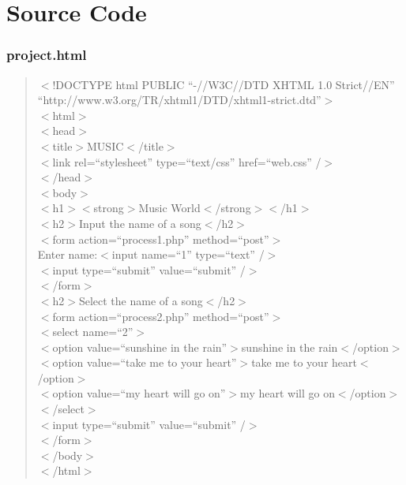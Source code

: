 \appendix
\chapter{Source Code}
\subsection*{project.html}
\begin{quote}
$<$!DOCTYPE html PUBLIC ``-//W3C//DTD XHTML 1.0 Strict//EN''\\
``http://www.w3.org/TR/xhtml1/DTD/xhtml1-strict.dtd''$>$\\
$<$html$>$\\

$<$head$>$\\
	$<$title$>$MUSIC$<$/title$>$\\
	$<$link rel=``stylesheet'' type=``text/css'' href=``web.css'' /$>$\\
$<$/head$>$\\

$<$body$>$\\

$<$h1$>$$<$strong$>$Music World$<$/strong$>$$<$/h1$>$\\

$<$h2$>$Input the name of a song$<$/h2$>$\\
$<$form action=``process1.php'' method=``post''$>$\\
Enter name:$<$input name=``1'' type=``text'' /$>$\\
$<$input  type=``submit'' value=``submit'' /$>$\\
$<$/form$>$\\

$<$h2$>$Select the name of a song$<$/h2$>$\\
$<$form action=``process2.php'' method=``post''$>$\\
$<$select name=``2''$>$\\
	$<$option value=``sunshine in the rain''$>$sunshine in the rain$<$/option$>$\\
	$<$option value=``take me to your heart''$>$take me to your heart$<$/option$>$\\
	$<$option value=``my heart will go on''$>$my heart will go on$<$/option$>$\\
$<$/select$>$\\
$<$input  type=``submit'' value=``submit'' /$>$\\
$<$/form$>$\\

$<$/body$>$\\
$<$/html$>$\\
\end{quote}



